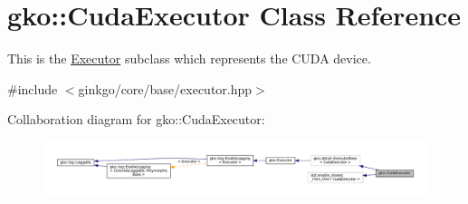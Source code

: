 \hypertarget{classgko_1_1CudaExecutor}{}\section{gko\+:\+:Cuda\+Executor Class Reference}
\label{classgko_1_1CudaExecutor}


This is the \hyperlink{classgko_1_1Executor}{Executor} subclass which represents the C\+U\+DA device.  




{\ttfamily \#include $<$ginkgo/core/base/executor.\+hpp$>$}



Collaboration diagram for gko\+:\+:Cuda\+Executor\+:
\nopagebreak
\begin{figure}[H]
\begin{center}
\leavevmode
\includegraphics[width=350pt]{classgko_1_1CudaExecutor__coll__graph}
\end{center}
\end{figure}
